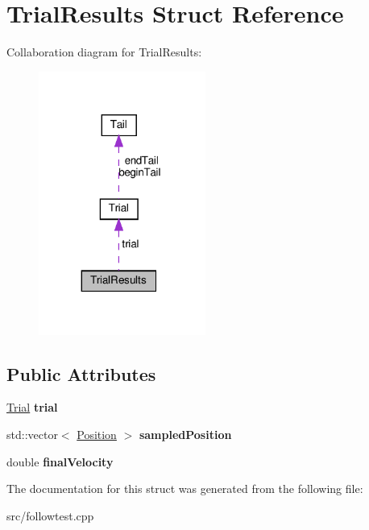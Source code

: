 \hypertarget{structTrialResults}{}\section{Trial\+Results Struct Reference}
\label{structTrialResults}


Collaboration diagram for Trial\+Results\+:\nopagebreak
\begin{figure}[H]
\begin{center}
\leavevmode
\includegraphics[width=155pt]{structTrialResults__coll__graph}
\end{center}
\end{figure}
\subsection*{Public Attributes}
\begin{DoxyCompactItemize}
\item 
\mbox{\label{structTrialResults_a50b678689a2a82f47d8239de709374ce}} 
\hyperlink{structTrial}{Trial} {\bfseries trial}
\item 
\mbox{\label{structTrialResults_a76e2d3fd3d323434445ee423ec94f957}} 
std\+::vector$<$ \hyperlink{structPosition}{Position} $>$ {\bfseries sampled\+Position}
\item 
\mbox{\label{structTrialResults_a65f94af5cc330c857703220759c184dc}} 
double {\bfseries final\+Velocity}
\end{DoxyCompactItemize}


The documentation for this struct was generated from the following file\+:\begin{DoxyCompactItemize}
\item 
src/followtest.\+cpp\end{DoxyCompactItemize}
